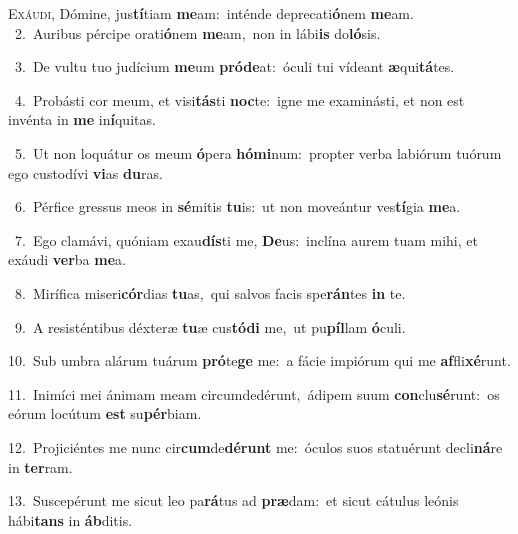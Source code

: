 \lettrine{\initial\textcolor{\initialcolor}{E}}{xáudi,} Dómine, jus\-\textbf{tí}\-tiam \textbf{me}\-am:~\star inténde deprecati\-\textbf{ó}\-nem \textbf{me}\-am.\\
{\numbfont\textcolor{\numbcolor}{~2.}}~Auribus pércipe orati\-\textbf{ó}\-nem \textbf{me}\-am,~\star non in lábi\textbf{is} do\-\textbf{ló}\-sis.\par
{\numbfont\textcolor{\numbcolor}{~3.}}~De vultu tuo judícium \textbf{me}\-um \textbf{pród}\-\textbf{e}at:~\star óculi tui vídeant \textbf{æ}\-qui\-\textbf{tá}\-tes.\par
{\numbfont\textcolor{\numbcolor}{~4.}}~Probásti cor meum, et visi\-\textbf{tás}\-ti \textbf{noc}\-te:~\star igne me examinásti, et non est invénta in \textbf{me} in\-\textbf{í}\-quitas.\par
{\numbfont\textcolor{\numbcolor}{~5.}}~Ut non loquátur os meum \textbf{ó}\-pera \textbf{hó}\-\textbf{mi}num:~\star propter verba labiórum tuórum ego custodívi \textbf{vi}\-as \textbf{du}\-ras.\par
{\numbfont\textcolor{\numbcolor}{~6.}}~Pérfice gressus meos in \textbf{sé}\-mitis \textbf{tu}\-is:~\star ut non moveántur ves\-\textbf{tí}\-gia \textbf{me}\-a.\par
{\numbfont\textcolor{\numbcolor}{~7.}}~Ego clamávi, quóniam exau\-\textbf{dís}\-ti me, \textbf{De}\-us:~\star inclína aurem tuam mihi, et exáudi \textbf{ver}\-ba \textbf{me}\-a.\par
{\numbfont\textcolor{\numbcolor}{~8.}}~Mirífica miseri\-\textbf{cór}\-dias \textbf{tu}\-as,~\star qui salvos facis spe\-\textbf{rán}\-tes \textbf{in} te.\par
{\numbfont\textcolor{\numbcolor}{~9.}}~A resisténtibus déxteræ \textbf{tu}\-æ cus\-\textbf{tó}\-\textbf{di} me,~\star ut pu\-\textbf{píl}\-lam \textbf{ó}\-culi.\par
{\numbfont\textcolor{\numbcolor}{10.}}~Sub umbra alárum tuárum \textbf{pró}\-te\textbf{ge} me:~\star a fácie impiórum qui me \textbf{af}\-fli\-\textbf{xé}\-runt.\par
{\numbfont\textcolor{\numbcolor}{11.}}~Inimíci mei ánimam meam circumdedérunt,~\dagger ádipem suum \textbf{con}\-clu\-\textbf{sé}\-runt:~\star os eórum locútum \textbf{est} su\-\textbf{pér}\-biam.\par
{\numbfont\textcolor{\numbcolor}{12.}}~Projiciéntes me nunc cir\-\textbf{cum}\-de\-\textbf{dé}\-\textbf{runt} me:~\star óculos suos statuérunt decli\-\textbf{ná}\-re in \textbf{ter}\-ram.\par
{\numbfont\textcolor{\numbcolor}{13.}}~Suscepérunt me sicut leo pa\-\textbf{rá}\-tus ad \textbf{præ}\-dam:~\star et sicut cátulus leónis hábi\textbf{tans} in \textbf{áb}\-ditis.\par
